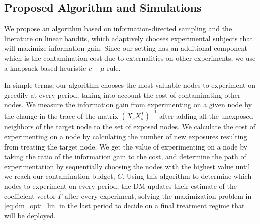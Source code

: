 \documentclass[11pt,a4paper]{article}
\begin{document}
\subsection{Proposed Algorithm and Simulations}

We propose an algorithm based on information-directed sampling and the literature on linear bandits, which adaptively chooses experimental subjects that will maximize information gain. Since our setting has an additional component which is the contamination cost due to externalities on other experiments, we use a knapsack-based heuristic $c-\mu$ rule.

In simple terms, our algorithm chooses the most valuable nodes to experiment on greedily at every period, taking into account the cost of contaminating other nodes. We measure the information gain from experimenting on a given node by the change in the trace of the matrix $( X_s X_s^T)^{-1}$ after adding all the unexposed neighbors of the target node to the set of exposed nodes. We calculate the cost of experimenting on a node by calculating the number of new exposures resulting from treating the target node. We get the value of experimenting on a node by taking the ratio of the information gain to the cost, and determine the path of experimentation by sequentially choosing the nodes with the highest value until we reach our contamination budget, $\bar{C}$. Using this algorithm to determine which nodes to experiment on every period, the DM updates their estimate of the coefficient vector $\hat \Gamma$ after every experiment, solving the maximization problem in \eqref{eq:dm_opti_lin} in the last period to decide on a final treatment regime that will be deployed.




%
%
%
%
%
\end{document}
